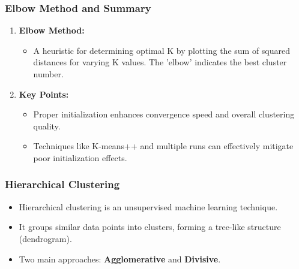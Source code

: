 \documentclass[aspectratio=169]{beamer}
\begin{document}
\begin{frame}[fragile]
    \frametitle{Elbow Method and Summary}
    \begin{enumerate}
        \item \textbf{Elbow Method:}
            \begin{itemize}
                \item A heuristic for determining optimal K by plotting the sum of squared distances for varying K values. The 'elbow' indicates the best cluster number.
            \end{itemize}
        \item \textbf{Key Points:}
            \begin{itemize}
                \item Proper initialization enhances convergence speed and overall clustering quality.
                \item Techniques like K-means++ and multiple runs can effectively mitigate poor initialization effects.
            \end{itemize}
    \end{enumerate}
\end{frame}

\begin{frame}
    \frametitle{Hierarchical Clustering}
    \begin{itemize}
        \item Hierarchical clustering is an unsupervised machine learning technique.
        \item It groups similar data points into clusters, forming a tree-like structure (dendrogram).
        \item Two main approaches: \textbf{Agglomerative} and \textbf{Divisive}.
    \end{itemize}
\end{frame}
\end{document}

